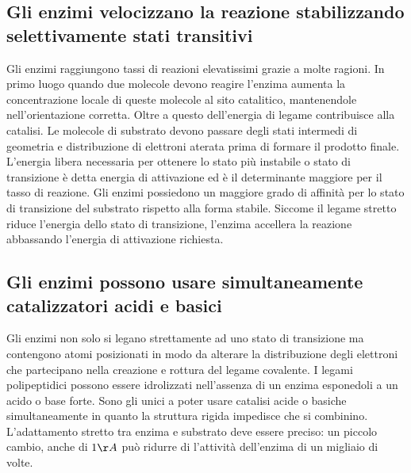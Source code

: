 \subsection{Gli enzimi velocizzano la reazione stabilizzando selettivamente stati transitivi}
Gli enzimi raggiungono tassi di reazioni elevatissimi grazie a molte ragioni. In primo luogo quando due molecole devono reagire l'enzima aumenta la concentrazione locale di queste 
molecole al sito catalitico, mantenendole nell'orientazione corretta. Oltre a questo dell'energia di legame contribuisce alla catalisi. Le molecole di substrato devono passare degli 
stati intermedi di geometria e distribuzione di elettroni aterata prima di formare il prodotto finale. L'energia libera necessaria per ottenere lo stato pi\`u instabile o stato di
transizione \`e detta energia di attivazione ed \`e il determinante maggiore per il tasso di reazione. Gli enzimi possiedono un maggiore grado di affinit\`a per lo stato di transizione
del substrato rispetto alla forma stabile. Siccome il legame stretto riduce l'energia dello stato di transizione, l'enzima accellera la reazione abbassando l'energia di attivazione 
richiesta.
\subsection{Gli enzimi possono usare simultaneamente catalizzatori acidi e basici}
Gli enzimi non solo si legano strettamente ad uno stato di transizione ma contengono atomi posizionati in modo da alterare la distribuzione degli elettroni che partecipano nella 
creazione e rottura del legame covalente. I legami polipeptidici possono essere idrolizzati nell'assenza di un enzima esponedoli a un acido o base forte. Sono gli unici a poter usare 
catalisi acide o basiche simultaneamente in quanto la struttura rigida impedisce che si combinino. L'adattamento stretto tra enzima e substrato deve essere preciso: un piccolo cambio, 
anche di $1\AA$ pu\`o ridurre di l'attivit\`a dell'enzima di un migliaio di volte.

